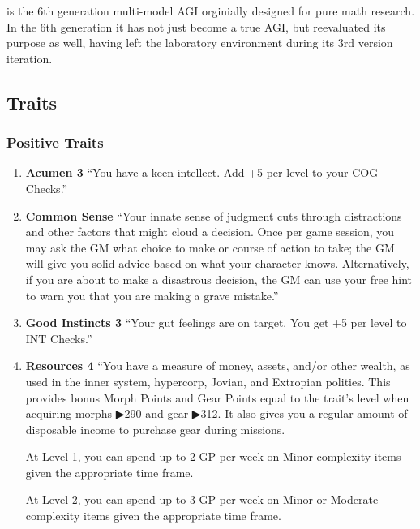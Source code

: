 
\characterHeading{\egr{}}

\texttt{\egr{}}\index{\egr{}} is the 6th generation multi-model \gls{AGI} orginially designed for pure math research. In the 6th generation it has not just become a true \gls{AGI}, but reevaluated its purpose as well, having left the laboratory environment during its 3rd version iteration.

\subsection{Traits}

\subsubsection{Positive Traits}

\begin{enumerate}
    \item \textbf{\gls{Acumen} 3} “You have a keen intellect. Add +5 per level to your COG Checks.” \citep[pg. 72]{ep2e_1.1_2019}

    \item \textbf{\gls{Common Sense}} “Your innate sense of judgment cuts through distractions and other factors that might cloud a decision. Once per game session, you may ask the GM what choice to make or course of action to take; the GM will give you solid advice based on what your character knows. Alternatively, if you are about to make a disastrous decision, the GM can use your free hint to warn you that you are making a grave mistake.” \citep[pg. 73]{ep2e_1.1_2019}

    \item \textbf{\gls{Good Instincts} 3} “Your gut feelings are on target. You get +5 per level to INT Checks.” \citep[pg. 74]{ep2e_1.1_2019}

    \item \textbf{\gls{Resources} 4} “You have a measure of money, assets, and/or other wealth, as used in the inner system, hypercorp, Jovian, and Extropian polities. This provides bonus Morph Points and Gear Points equal to the trait's level when acquiring morphs ▶290 and gear ▶312. It also gives you a regular amount of disposable income to purchase gear during missions.

    At Level 1, you can spend up to 2 GP per week on Minor complexity items given the appropriate time frame.
    
    At Level 2, you can spend up to 3 GP per week on Minor or Moderate complexity items given the appropriate time frame.
    

\end{enumerate}
